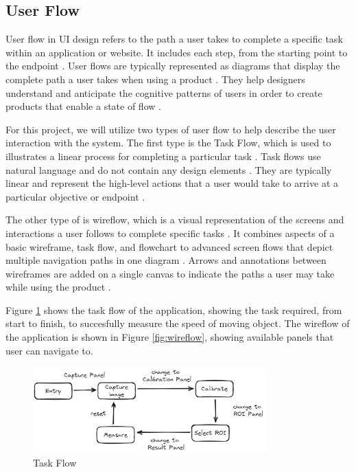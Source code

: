 \subsection{User Flow}
\label{subsec:user-flow}

User flow in UI design refers to the path a user takes to complete a specific task within an application or website. It includes each step, from the starting point to the endpoint \cite{Dai_2022}. User flows are typically represented as diagrams that display the complete path a user takes when using a product \cite{Browne_2023}. They help designers understand and anticipate the cognitive patterns of users in order to create products that enable a state of flow \cite{Browne_2023}.

For this project, we will utilize two types of user flow to help describe the user interaction with the system. The first type is the Task Flow, which is used to illustrates a linear process for completing a particular task \cite{Trigo_2023}. Task flows use natural language and do not contain any design elements \cite{Trigo_2023}. They are typically linear and represent the high-level actions that a user would take to arrive at a particular objective or endpoint \cite{Rahul_2022}.

The other type of is wireflow, which is a visual representation of the screens and interactions a user follows to complete specific tasks \cite{Trigo_2023}. It combines aspects of a basic wireframe, task flow, and flowchart to advanced screen flows that depict multiple navigation paths in one diagram \cite{Trigo_2023}. Arrows and annotations between wireframes are added on a single canvas to indicate the paths a user may take while using the product \cite{Angeles}.

Figure \ref{fig:task-flow} shows the task flow of the application, showing the task required, from start to finish, to succesfully measure the speed of moving object. The wireflow of the application is shown in Figure \ref{fig:wireflow}, showing available panels that user can navigate to.

\begin{figure}[!ht]
    \centering
    \includegraphics[width=0.8\textwidth]{texs/Part2/chapter3/image/taskflow.png}
    \caption{Task Flow}
    \label{fig:task-flow}
\end{figure}

